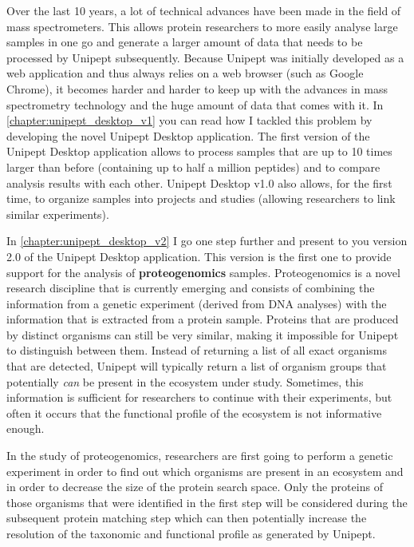 Over the last 10 years, a lot of technical advances have been made in the field of mass spectrometers.
This allows protein researchers to more easily analyse large samples in one go and generate a larger amount of data that needs to be processed by Unipept subsequently.
Because Unipept was initially developed as a web application and thus always relies on a web browser (such as Google Chrome), it becomes harder and harder to keep up with the advances in mass spectrometry technology and the huge amount of data that comes with it.
In \autoref{chapter:unipept_desktop_v1} you can read how I tackled this problem by developing the novel Unipept Desktop application.
The first version of the Unipept Desktop application allows to process samples that are up to 10 times larger than before (containing up to half a million peptides) and to compare analysis results with each other.
Unipept Desktop v1.0 also allows, for the first time, to organize samples into projects and studies (allowing researchers to link similar experiments).

In \autoref{chapter:unipept_desktop_v2} I go one step further and present to you version 2.0 of the Unipept Desktop application.
This version is the first one to provide support for the analysis of \textbf{proteogenomics} samples.
Proteogenomics is a novel research discipline that is currently emerging and consists of combining the information from a genetic experiment (derived from DNA analyses) with the information that is extracted from a protein sample.
Proteins that are produced by distinct organisms can still be very similar, making it impossible for Unipept to distinguish between them.
Instead of returning a list of all exact organisms that are detected, Unipept will typically return a list of organism groups that potentially \textit{can} be present in the ecosystem under study.
Sometimes, this information is sufficient for researchers to continue with their experiments, but often it occurs that the functional profile of the ecosystem is not informative enough.

In the study of proteogenomics, researchers are first going to perform a genetic experiment in order to find out which organisms are present in an ecosystem and in order to decrease the size of the protein search space.
Only the proteins of those organisms that were identified in the first step will be considered during the subsequent protein matching step which can then potentially increase the resolution of the taxonomic and functional profile as generated by Unipept.

